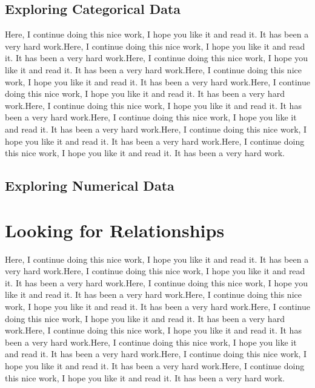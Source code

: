 \documentclass[11pt]{article}
\begin{document}
\subsection{Exploring Categorical Data}\label{catexplo}

Here, I continue doing this nice work, I hope you like it and read it. It has been a very hard work.Here, I continue doing this nice work, I hope you like it and read it. It has been a very hard work.Here, I continue doing this nice work, I hope you like it and read it. It has been a very hard work.Here, I continue doing this nice work, I hope you like it and read it. It has been a very hard work.Here, I continue doing this nice work, I hope you like it and read it. It has been a very hard work.Here, I continue doing this nice work, I hope you like it and read it. It has been a very hard work.Here, I continue doing this nice work, I hope you like it and read it. It has been a very hard work.Here, I continue doing this nice work, I hope you like it and read it. It has been a very hard work.Here, I continue doing this nice work, I hope you like it and read it. It has been a very hard work.


\subsection{Exploring Numerical Data}\label{numexplo}


\section{Looking for Relationships}\label{bivar}


Here, I continue doing this nice work, I hope you like it and read it. It has been a very hard work.Here, I continue doing this nice work, I hope you like it and read it. It has been a very hard work.Here, I continue doing this nice work, I hope you like it and read it. It has been a very hard work.Here, I continue doing this nice work, I hope you like it and read it. It has been a very hard work.Here, I continue doing this nice work, I hope you like it and read it. It has been a very hard work.Here, I continue doing this nice work, I hope you like it and read it. It has been a very hard work.Here, I continue doing this nice work, I hope you like it and read it. It has been a very hard work.Here, I continue doing this nice work, I hope you like it and read it. It has been a very hard work.Here, I continue doing this nice work, I hope you like it and read it. It has been a very hard work.
\end{document}
